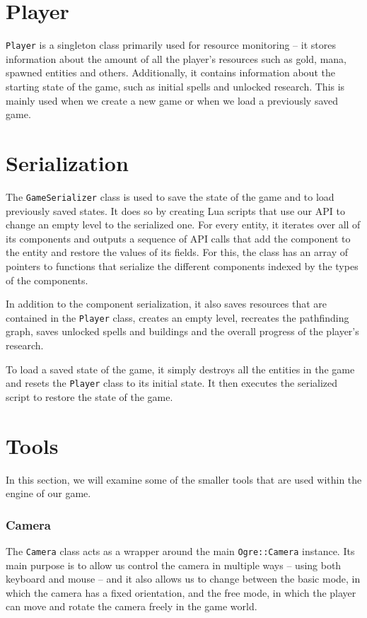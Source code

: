 \section{Player}

\texttt{Player} is a singleton class primarily used for resource monitoring -- it stores information about the amount of all the player's
resources such as gold, mana, spawned entities and others. Additionally, it contains information about the starting state of the game,
such as initial spells and unlocked research. This is mainly used when we create a new game or when we load a previously saved game.

\section{Serialization}

The \texttt{GameSerializer} class is used to save the state of the game and to load previously saved states. It does so by creating Lua
scripts that use our API to change an empty level to the serialized one. For every entity, it iterates over all of its components and
outputs a sequence of API calls that add the component to the entity and restore the values of its fields. For this, the class has
an array of pointers to functions that serialize the different components indexed by the types of the components.

In addition to the component serialization, it also saves resources that are contained in the \texttt{Player} class, creates an empty
level, recreates the pathfinding graph, saves unlocked spells and buildings and the overall progress of the player's research.

To load a saved state of the game, it simply destroys all the entities in the game and resets the \texttt{Player} class to its initial state.
It then executes the serialized script to restore the state of the game.

\section{Tools}

In this section, we will examine some of the smaller tools that are used within the engine of our game.

\subsubsection{Camera}

The \texttt{Camera} class acts as a wrapper around the main \texttt{Ogre::Camera} instance. Its main purpose is to allow us control the
camera in multiple ways -- using both keyboard and mouse -- and it also allows us to change between the basic mode, in which the camera
has a fixed orientation, and the free mode, in which the player can move and rotate the camera freely in the game world.

